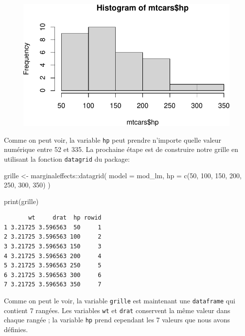 \documentclass[
  letterpaper,
  DIV=11,
  numbers=noendperiod]{scrreprt}
\newenvironment{Shaded}{\begin{snugshade}}{\end{snugshade}}
\newcommand{\AttributeTok}[1]{\textcolor[rgb]{0.40,0.45,0.13}{#1}}
\newcommand{\DecValTok}[1]{\textcolor[rgb]{0.68,0.00,0.00}{#1}}
\newcommand{\FunctionTok}[1]{\textcolor[rgb]{0.28,0.35,0.67}{#1}}
\newcommand{\NormalTok}[1]{\textcolor[rgb]{0.00,0.23,0.31}{#1}}
\newcommand{\OtherTok}[1]{\textcolor[rgb]{0.00,0.23,0.31}{#1}}
\newcommand{\SpecialCharTok}[1]{\textcolor[rgb]{0.37,0.37,0.37}{#1}}
\begin{document}
\begin{figure}[H]

{\centering \includegraphics{chapitre_6_files/figure-pdf/unnamed-chunk-8-1.pdf}

}

\end{figure}

Comme on peut voir, la variable \texttt{hp} peut prendre n'importe
quelle valeur numérique entre 52 et 335. La prochaine étape est de
construire notre grille en utilisant la fonction \texttt{datagrid} du
package:

\begin{Shaded}
\begin{Highlighting}[]
\NormalTok{grille }\OtherTok{\textless{}{-}}\NormalTok{ marginaleffects}\SpecialCharTok{::}\FunctionTok{datagrid}\NormalTok{(}
      \AttributeTok{model =}\NormalTok{ mod\_lm,}
      \AttributeTok{hp =} \FunctionTok{c}\NormalTok{(}\DecValTok{50}\NormalTok{, }\DecValTok{100}\NormalTok{, }\DecValTok{150}\NormalTok{, }\DecValTok{200}\NormalTok{, }\DecValTok{250}\NormalTok{, }\DecValTok{300}\NormalTok{, }\DecValTok{350}\NormalTok{)}
\NormalTok{)}

\FunctionTok{print}\NormalTok{(grille)}
\end{Highlighting}
\end{Shaded}

\begin{verbatim}
       wt     drat  hp rowid
1 3.21725 3.596563  50     1
2 3.21725 3.596563 100     2
3 3.21725 3.596563 150     3
4 3.21725 3.596563 200     4
5 3.21725 3.596563 250     5
6 3.21725 3.596563 300     6
7 3.21725 3.596563 350     7
\end{verbatim}

Comme on peut le voir, la variable \texttt{grille} est maintenant une
\texttt{dataframe} qui contient 7 rangées. Les variables \texttt{wt} et
\texttt{drat} conservent la même valeur dans chaque rangée ; la variable
\texttt{hp} prend cependant les 7 valeurs que nous avons définies.
\end{document}
